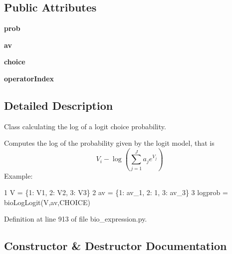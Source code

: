 \subsection*{Public Attributes}
\begin{DoxyCompactItemize}
\item 
{\bfseries prob}\hypertarget{classbio__expression_1_1bio_log_logit_aa9285cd4c43e3971d1826df2d0539485}{}\label{classbio__expression_1_1bio_log_logit_aa9285cd4c43e3971d1826df2d0539485}

\item 
{\bfseries av}\hypertarget{classbio__expression_1_1bio_log_logit_a0d9b462c9a6fdac433eb8533fe684017}{}\label{classbio__expression_1_1bio_log_logit_a0d9b462c9a6fdac433eb8533fe684017}

\item 
{\bfseries choice}\hypertarget{classbio__expression_1_1bio_log_logit_abe5b0cbd989c8c26eadab9122ad6bf89}{}\label{classbio__expression_1_1bio_log_logit_abe5b0cbd989c8c26eadab9122ad6bf89}

\item 
{\bfseries operator\+Index}\hypertarget{classbio__expression_1_1bio_log_logit_afaee157bd3e3ff25d79af92ee29bd49c}{}\label{classbio__expression_1_1bio_log_logit_afaee157bd3e3ff25d79af92ee29bd49c}

\end{DoxyCompactItemize}


\subsection{Detailed Description}
Class calculating the log of a logit choice probability. 

Computes the log of the probability given by the logit model, that is \[ V_i - \log\left(\sum_{j=1}^{J} a_j e^{V_j}\right) \] Example\+: 
\begin{DoxyCode}
1 V = \{1: V1, 2: V2, 3: V3\}
2 av = \{1: av\_1, 2: 1, 3: av\_3\}
3 logprob = bioLogLogit(V,av,CHOICE) 
\end{DoxyCode}
 

Definition at line 913 of file bio\+\_\+expression.\+py.



\subsection{Constructor \& Destructor Documentation}
